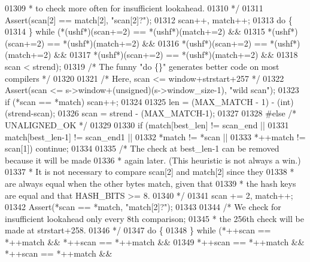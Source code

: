 \begin{DoxyCode}
{01309 \textcolor{comment}{         * to check more often for insufficient lookahead.}
01310 \textcolor{comment}{         */}
01311         Assert(scan[2] == match[2], \textcolor{stringliteral}{"scan[2]?"});
01312         scan++, match++;
01313         \textcolor{keywordflow}{do} \{
01314         \} \textcolor{keywordflow}{while} (*(ushf*)(scan+=2) == *(ushf*)(match+=2) &&
01315                  *(ushf*)(scan+=2) == *(ushf*)(match+=2) &&
01316                  *(ushf*)(scan+=2) == *(ushf*)(match+=2) &&
01317                  *(ushf*)(scan+=2) == *(ushf*)(match+=2) &&
01318                  scan < strend);
01319         \textcolor{comment}{/* The funny "do \{\}" generates better code on most compilers */}
01320 
01321         \textcolor{comment}{/* Here, scan <= window+strstart+257 */}
01322         Assert(scan <= s->window+(\textcolor{keywordtype}{unsigned})(s->window\_size-1), \textcolor{stringliteral}{"wild scan"});
01323         \textcolor{keywordflow}{if} (*scan == *match) scan++;
01324 
01325         len = (MAX\_MATCH - 1) - (\textcolor{keywordtype}{int})(strend-scan);
01326         scan = strend - (MAX\_MATCH-1);
01327 
01328 \textcolor{preprocessor}{#else }\textcolor{comment}{/* UNALIGNED\_OK */}\textcolor{preprocessor}{}
01329 
01330         \textcolor{keywordflow}{if} (match[best\_len]   != scan\_end  ||
01331             match[best\_len-1] != scan\_end1 ||
01332             *match            != *scan     ||
01333             *++match          != scan[1])      \textcolor{keywordflow}{continue};
01334 
01335         \textcolor{comment}{/* The check at best\_len-1 can be removed because it will be made}
01336 \textcolor{comment}{         * again later. (This heuristic is not always a win.)}
01337 \textcolor{comment}{         * It is not necessary to compare scan[2] and match[2] since they}
01338 \textcolor{comment}{         * are always equal when the other bytes match, given that}
01339 \textcolor{comment}{         * the hash keys are equal and that HASH\_BITS >= 8.}
01340 \textcolor{comment}{         */}
01341         scan += 2, match++;
01342         Assert(*scan == *match, \textcolor{stringliteral}{"match[2]?"});
01343 
01344         \textcolor{comment}{/* We check for insufficient lookahead only every 8th comparison;}
01345 \textcolor{comment}{         * the 256th check will be made at strstart+258.}
01346 \textcolor{comment}{         */}
01347         \textcolor{keywordflow}{do} \{
01348         \} \textcolor{keywordflow}{while} (*++scan == *++match && *++scan == *++match &&
01349                  *++scan == *++match && *++scan == *++match &&
}
\end{DoxyCode}
